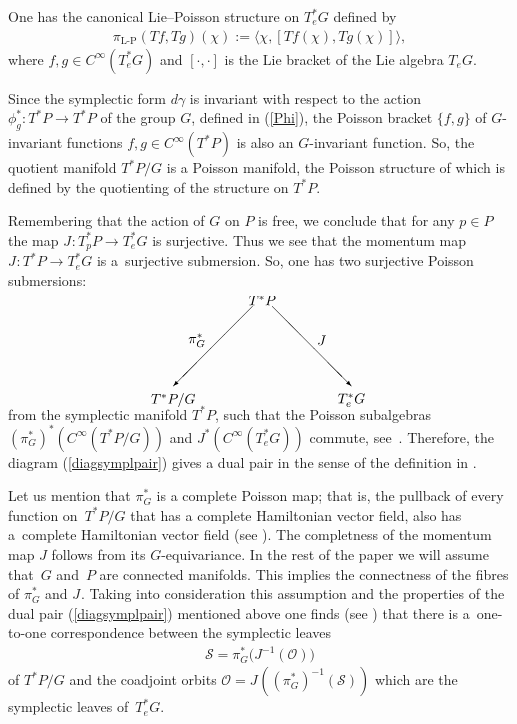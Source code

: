 \documentclass[pdftex]{sigma}
\renewcommand{\O}{\mathcal{O}}
\renewcommand{\S}{\mathcal{S}}
\renewcommand{\to}{\rightarrow}
\numberwithin{equation}{section}
\begin{document}
One has the canonical Lie--Poisson structure on $T^*_eG$ def\/ined by
\begin{gather}\label{nawias}
\pi_{\text{L-P}}(Tf, Tg)(\chi):=\langle \chi,[Tf(\chi), Tg(\chi)]\rangle,
\end{gather}
where $f,g\in C^\infty(T^*_eG)$ and $[\cdot,\cdot]$ is the Lie bracket of the Lie algebra $T_eG$.

Since the symplectic form $d\gamma$ is invariant with respect to the action $\phi_g^*\colon T^*P\to T^*P$ of the group $G$, def\/ined in (\ref{Phi}), the Poisson bracket $\{f,g\}$ of $G$-invariant functions $f,g\in C^\infty(T^*P)$ is also an $G$-invariant function. So, the quotient manifold $T^*P/G$ is a Poisson manifold, the Poisson structure of which is def\/ined by the quotienting of the structure on $T^*P$.

Remembering that the action of $G$ on $P$ is free, we conclude that for any $p\in P$ the map $J_{}\colon T^*_pP\to T^*_e G$ is surjective. Thus we see that the momentum map $J_{}\colon T^*P\to T^*_e G$ is a~surjective submersion. So, one has two surjective Poisson submersions:
\begin{gather}\label{diagsymplpair}\unitlength=5mm \begin{split}
& \begin{picture}(11,4.6)(-1.5,0)
 \put(4.5,4.5){\makebox(0,0){$T^*P$}}
 \put(0,-0.5){\makebox(0,0){$T^*P/G$}}
 \put(9,-0.5){\makebox(0,0){$ T^*_e G$}}
 \put(4,4.2){\vector(-1,-1){4}}
 \put(5,4.2){\vector(1,-1){4}}
 \put(1.2,2.5){\makebox(0,0){$\pi^*_G$}}
 \put(7.5,2.5){\makebox(0,0){$J$}}
 \end{picture}\end{split}
\end{gather}
from the symplectic manifold $T^*P$, such that the Poisson subalgebras $(\pi^*_G)^* (C^\infty (T^*P/G))$ and $J^* (C^\infty(T_e^*G))$ commute, see~\cite{Wei}.
Therefore, the diagram (\ref{diagsymplpair}) gives a dual pair in the sense of the def\/inition in \cite[Section~9.3]{Wei}.

Let us mention that $\pi^*_G$ is a complete Poisson map; that is, the pullback of every function on~$T^*P/G$ that has a complete Hamiltonian vector f\/ield, also has a~complete Hamiltonian vector f\/ield (see \cite[Proposition~6.6]{Wei}). The completness of the momentum map $J$ follows from its $G$-equivariance.
In the rest of the paper we will assume that~$G$ and~$P$ are connected manifolds. This implies the connectness of the f\/ibres of $\pi^*_G$ and $J_{}$. Taking into consideration this assumption and the properties of the dual pair (\ref{diagsymplpair}) mentioned above one f\/inds (see \cite{Wei}) that there is a~one-to-one correspondence between the symplectic leaves
\begin{gather}\label{orbits}\S=\pi^*_G\big(J_{}^{-1}(\O)\big)\end{gather}
of $T^*P/G$ and the coadjoint orbits $ \O=J_{}((\pi^*_G)^{-1}(\S))$ which are the symplectic leaves of~$ T^*_e G$.
\end{document}
